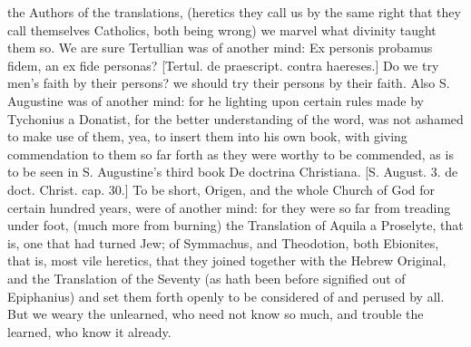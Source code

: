 {the Authors of the translations, (heretics they call us by the same right that they call themselves Catholics, both being wrong) we marvel what divinity taught them so. We are sure Tertullian was of another mind: Ex personis probamus fidem, an ex fide personas? [Tertul. de praescript. contra haereses.] Do we try men’s faith by their persons? we should try their persons by their faith. Also S. Augustine was of another mind: for he lighting upon certain rules made by Tychonius a Donatist, for the better understanding of the word, was not ashamed to make use of them, yea, to insert them into his own book, with giving commendation to them so far forth as they were worthy to be commended, as is to be seen in S. Augustine’s third book De doctrina Christiana. [S. August. 3. de doct. Christ. cap. 30.] To be short, Origen, and the whole Church of God for certain hundred years, were of another mind: for they were so far from treading under foot, (much more from burning) the Translation of Aquila a Proselyte, that is, one that had turned Jew; of Symmachus, and Theodotion, both Ebionites, that is, most vile heretics, that they joined together with the Hebrew Original, and the Translation of the Seventy (as hath been before signified out of Epiphanius) and set them forth openly to be considered of and perused by all. But we weary the unlearned, who need not know so much, and trouble the learned, who know it already.
}
